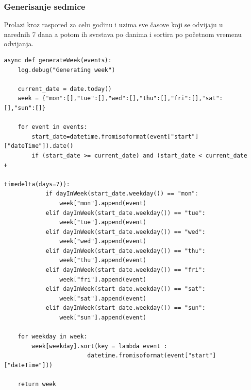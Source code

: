 \documentclass[a4paper,11pt]{article}
\begin{document}
\subsubsection{Generisanje sedmice}
Prolazi kroz raspored za celu godinu i uzima sve časove koji se odvijaju u narednih 7 dana a potom ih svrstava po danima i sortira po početnom vremenu odvijanja.
\begin{verbatim}
async def generateWeek(events):
    log.debug("Generating week")

    current_date = date.today()
    week = {"mon":[],"tue":[],"wed":[],"thu":[],"fri":[],"sat":[],"sun":[]}

    for event in events:
        start_date=datetime.fromisoformat(event["start"]["dateTime"]).date()
        if (start_date >= current_date) and (start_date < current_date + 
                                                        timedelta(days=7)):
            if dayInWeek(start_date.weekday()) == "mon":
                week["mon"].append(event)
            elif dayInWeek(start_date.weekday()) == "tue":
                week["tue"].append(event)
            elif dayInWeek(start_date.weekday()) == "wed":
                week["wed"].append(event)
            elif dayInWeek(start_date.weekday()) == "thu":
                week["thu"].append(event)
            elif dayInWeek(start_date.weekday()) == "fri":
                week["fri"].append(event)
            elif dayInWeek(start_date.weekday()) == "sat":
                week["sat"].append(event)
            elif dayInWeek(start_date.weekday()) == "sun":
                week["sun"].append(event)

    for weekday in week:
        week[weekday].sort(key = lambda event : 
                        datetime.fromisoformat(event["start"]["dateTime"]))

    return week
\end{verbatim}
\newpage
\end{document}
